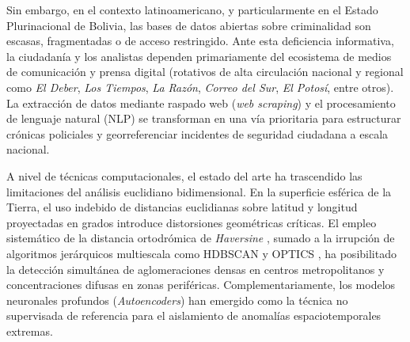 Sin embargo, en el contexto latinoamericano, y particularmente en el Estado Plurinacional de Bolivia, las bases de datos abiertas sobre criminalidad son escasas, fragmentadas o de acceso restringido. Ante esta deficiencia informativa, la ciudadanía y los analistas dependen primariamente del ecosistema de medios de comunicación y prensa digital (rotativos de alta circulación nacional y regional como \textit{El Deber}, \textit{Los Tiempos}, \textit{La Razón}, \textit{Correo del Sur}, \textit{El Potosí}, entre otros). La extracción de datos mediante raspado web (\textit{web scraping}) y el procesamiento de lenguaje natural (NLP) se transforman en una vía prioritaria para estructurar crónicas policiales y georreferenciar incidentes de seguridad ciudadana a escala nacional.

A nivel de técnicas computacionales, el estado del arte ha trascendido las limitaciones del análisis euclidiano bidimensional. En la superficie esférica de la Tierra, el uso indebido de distancias euclidianas sobre latitud y longitud proyectadas en grados introduce distorsiones geométricas críticas. El empleo sistemático de la distancia ortodrómica de \textit{Haversine} \cite{sinnott1984}, sumado a la irrupción de algoritmos jerárquicos multiescala como HDBSCAN \cite{campello2013} y OPTICS \cite{ankerst1999}, ha posibilitado la detección simultánea de aglomeraciones densas en centros metropolitanos y concentraciones difusas en zonas periféricas. Complementariamente, los modelos neuronales profundos (\textit{Autoencoders}) \cite{hinton2006} han emergido como la técnica no supervisada de referencia para el aislamiento de anomalías espaciotemporales extremas.

